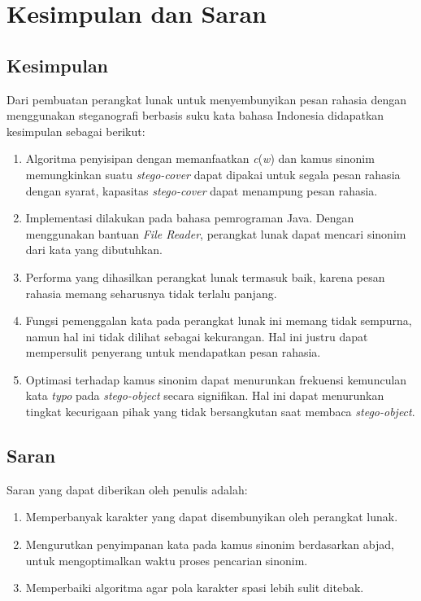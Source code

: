 \chapter{Kesimpulan dan Saran}
\section{Kesimpulan}
Dari pembuatan perangkat lunak untuk menyembunyikan pesan rahasia dengan menggunakan steganografi berbasis suku kata bahasa Indonesia didapatkan kesimpulan sebagai berikut:
\begin{enumerate}
	\item Algoritma penyisipan dengan memanfaatkan \textit{c}(\textit{w}) dan kamus sinonim memungkinkan suatu \textit{stego-cover} dapat dipakai untuk segala pesan rahasia dengan syarat, kapasitas \textit{stego-cover} dapat menampung pesan rahasia.
	\item Implementasi dilakukan pada bahasa pemrograman Java. Dengan menggunakan bantuan \textit{File Reader}, perangkat lunak dapat mencari sinonim dari kata yang dibutuhkan.
	\item Performa yang dihasilkan perangkat lunak termasuk baik, karena pesan rahasia memang seharusnya tidak terlalu panjang.
	\item Fungsi pemenggalan kata pada perangkat lunak ini memang tidak sempurna, namun hal ini tidak dilihat sebagai kekurangan. Hal ini justru dapat mempersulit penyerang untuk mendapatkan pesan rahasia.
	\item Optimasi terhadap kamus sinonim dapat menurunkan frekuensi kemunculan kata \textit{typo} pada \textit{stego-object} secara signifikan. Hal ini dapat menurunkan tingkat kecurigaan pihak yang tidak bersangkutan saat membaca \textit{stego-object}.
	
\end{enumerate}

\section{Saran}
Saran yang dapat diberikan oleh penulis adalah:
\begin{enumerate}
	\item Memperbanyak karakter yang dapat disembunyikan oleh perangkat lunak.
	\item Mengurutkan penyimpanan kata pada kamus sinonim berdasarkan abjad, untuk mengoptimalkan waktu proses pencarian sinonim.
	\item Memperbaiki algoritma agar pola karakter spasi lebih sulit ditebak.
\end{enumerate}